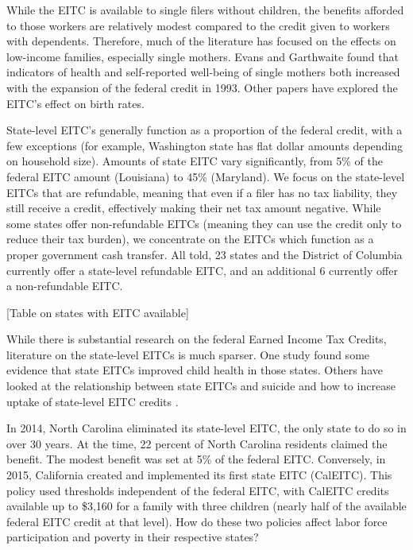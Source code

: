 \documentclass{article}
\begin{document}
While the EITC is available to single filers without children, the benefits afforded to those workers are relatively modest compared to the credit given to workers with dependents. Therefore, much of the literature has focused on the effects on low-income families, especially single mothers. Evans and Garthwaite found that indicators of health and self-reported well-being of single mothers both increased with the expansion of the federal credit in 1993. \cite{ evans2014giving} Other papers have explored the EITC’s effect on birth rates. \cite{baughman2003did}

State-level EITC’s generally function as a proportion of the federal credit, with a few exceptions (for example, Washington state has flat dollar amounts depending on household size). Amounts of state EITC vary significantly, from 5\% of the federal EITC amount (Louisiana) to 45\% (Maryland). We focus on the state-level EITCs that are refundable, meaning that even if a filer has no tax liability, they still receive a credit, effectively making their net tax amount negative. While some states offer non-refundable EITCs (meaning they can use the credit only to reduce their tax burden), we concentrate on the EITCs which function as a proper government cash transfer. All told, 23 states and the District of Columbia currently offer a state-level refundable EITC, and an additional 6 currently offer a non-refundable EITC.

[Table on states with EITC available]

While there is substantial research on the federal Earned Income Tax Credits, literature on the state-level EITCs is much sparser. One study found some evidence that state EITCs improved child health in those states. \cite{baughman2012effects} Others have looked at the relationship between state EITCs and suicide \cite{lenhart2019effects} and how to increase uptake of state-level EITC credits \cite{linos2020can}. 

In 2014, North Carolina eliminated its state-level EITC, the only state to do so in over 30 years. \cite{wunc} At the time, 22 percent of North Carolina residents claimed the benefit. The modest benefit was set at 5\% of the federal EITC. Conversely, in 2015, California created and implemented its first state EITC (CalEITC). This policy used thresholds independent of the federal EITC, with CalEITC credits available up to \$3,160 for a family with three children (nearly half of the available federal EITC credit at that level). How do these two policies affect labor force participation and poverty in their respective states? 
\end{document}
